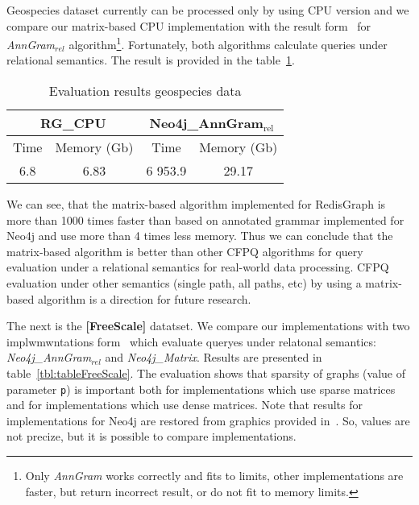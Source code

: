 Geospecies dataset currently can be processed only by using CPU version and we compare our matrix-based CPU implementation with the result form~\cite{Kuijpers:2019:ESC:3335783.3335791} for \textit{AnnGram$_{\textit{rel}}$} algorithm\footnote{Only \textit{AnnGram} works correctly and fits to limits, other implementations are faster, but return incorrect result, or do not fit to memory limits.}.
Fortunately, both algorithms calculate queries under relational semantics.
The result is provided in the table~\ref{tbl:geo}.

{\setlength{\tabcolsep}{0.4em}
\begin{table}[H]
\caption{Evaluation results geospecies data}
\label{tbl:geo}
\begin{tabular}{| c | c | c | c | }
    \hline
     \multicolumn{2}{|c|}{RG\_CPU}     & \multicolumn{2}{|c|}{Neo4j\_AnnGram$_{\text{rel}}$}          \\
     \hline
     Time  & Memory (Gb)  & Time  & Memory (Gb)   \\
    \hline
    \hline
    6.8   & 6.83    & 6 953.9  & 29.17   \\
    \hline
\end{tabular}
\end{table}
}

We can see, that the matrix-based algorithm implemented for RedisGraph is more than 1000 times faster than based on annotated grammar implemented for Neo4j and use more than 4 times less memory.
Thus we can conclude that the matrix-based algorithm is better than other CFPQ algorithms for query evaluation under a relational semantics for real-world data processing.
CFPQ evaluation under other semantics (single path, all paths, etc) by using a matrix-based algorithm is a direction for future research.

The next is the \textbf{[FreeScale]} datatset.
We compare our implementations with two implwmwntations form~\cite{Kuijpers:2019:ESC:3335783.3335791} which evaluate queryes under relatonal semantics: \textit{Neo4j\_AnnGram${_\textit{rel}}$} and \textit{Neo4j\_Matrix}. Results are presented in table~\ref{tbl:tableFreeScale}.
The evaluation shows that sparsity of graphs (value of parameter \texttt{p}) is important both for implementations which use sparse matrices and for implementations which use dense matrices.
Note that results for implementations for Neo4j are restored from graphics provided in~\cite{Kuijpers:2019:ESC:3335783.3335791}.
So, values are not precize, but it is possible to compare implementations.

